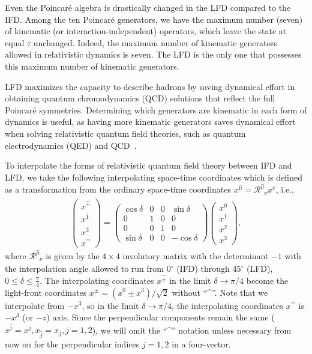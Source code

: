 \documentclass[foundations,article,submit,pdftex,moreauthors]{Definitions/mdpi}
\newcommand{\muT}{\hat{\mu}}
\newcommand{\itP}[1]{\hat{#1}}
\begin{document}
Even the Poincar\'e algebra is drastically changed in the LFD compared to the IFD.
Among the ten Poincar\'e generators, we have the maximum number (seven) of kinematic (or interaction-independent) operators, which leave the state at { equal $\tau$} unchanged. Indeed, the maximum number of kinematic generators allowed in relativistic dynamics is seven. The LFD is the only one that possesses this maximum number of kinematic generators.

LFD maximizes the capacity to
describe hadrons by saving dynamical effort in obtaining quantum chromodynamics (QCD) solutions that reflect the full Poincar\'e symmetries. Determining which generators are kinematic in each form of dynamics is useful, as having more kinematic generators saves dynamical effort when solving relativistic quantum field theories, such as quantum electrodynamics (QED) and QCD~\cite{ji2023relativistic}.

To interpolate the forms of relativistic quantum field theory between IFD and LFD, we take the following interpolating space-time coordinates  \cite{Ji2001, Hornbostel1992, Ji1996, Ji2012, Ji2015EM, Ji2015SP, Ji2018QED, Ji2021QCD, Ravikumar:2021xck} which is defined as a transformation from the ordinary space-time coordinates $x^{\muT}=\mathcal{R}^{\muT}_{\phantom{\mu}{\nu}}x^{\nu}$, i.e.,
\begin{align}\label{eqn:interpolation_angle_definition}
  \begin{pmatrix}
    x^{\hat{+}}\\
    x^{\hat{1}}\\
    x^{\hat{2}}\\
    x^{\hat{-}}
  \end{pmatrix}=
  \begin{pmatrix}
    \cos\delta & 0  & 0  & \sin\delta \\
    0          & 1  & 0  & 0 \\
    0          & 0  & 1  & 0 \\
    \sin\delta & 0  & 0  & -\cos\delta
  \end{pmatrix}
  \begin{pmatrix}
    x^{0}\\
    x^{1}\\
    x^{2}\\
    x^{3}
  \end{pmatrix},
\end{align}
where $\mathcal{R}^{\muT}_{\phantom{\mu}{\nu}}$ is given by the $4\times4$ involutory matrix with the determinant $-1$ with the interpolation angle allowed to run from $0^\circ$ (IFD) through $45^\circ$ (LFD), $0\le \delta \le \frac{\pi}{4}$. The interpolating coordinates $x^{\itP{\pm}}$ in the limit $\delta\rightarrow\pi/4$ become the light-front coordinates $x^{\pm}=(x^{0}\pm x^{3})/\sqrt{2}$ without  ``\textasciicircum''. Note that we interpolate from $-x^3$, so in the limit $\delta\rightarrow\pi/4$, the interpolating coordinates $x^{\itP{-}}$ is $-x^3$ (or $-z$) axis. Since the perpendicular components remain the same ($x^{\itP{j}}=x^{j},x_{\itP{j}}=x_{j}, j=1,2$), we will omit the ``\textasciicircum''  notation unless necessary from now on for the perpendicular indices $j=1,2$ in a four-vector.
\end{document}
